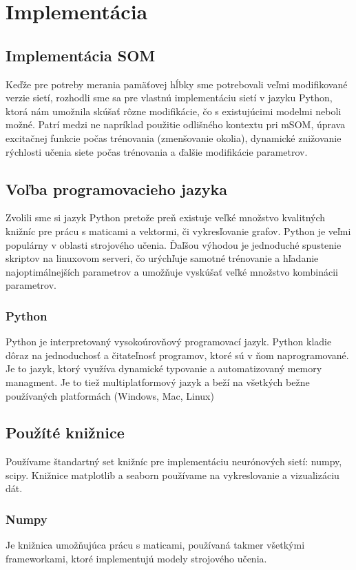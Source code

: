 \chapter{Implementácia}

\section{Implementácia SOM}
Keďže pre potreby merania pamäťovej hĺbky sme potrebovali 
veľmi modifikované verzie sietí, rozhodli sme sa pre vlastnú implementáciu sietí
v jazyku Python, ktorá nám umožnila skúšať rôzne modifikácie, čo 
s existujúcimi modelmi neboli možné. Patrí medzi ne napríklad použitie odlišného kontextu pri mSOM, 
úprava excitačnej funkcie počas trénovania (zmenšovanie okolia), dynamické znižovanie rýchlosti
učenia siete počas trénovania a ďalšie modifikácie parametrov.

\section{Voľba programovacieho jazyka}
Zvolili sme si jazyk Python pretože preň existuje veľké množstvo kvalitných knižníc pre prácu
s maticami a vektormi, či vykresľovanie grafov.
Python je veľmi populárny v oblasti strojového učenia. Ďaľšou výhodou je jednoduché spustenie skriptov
na linuxovom serveri, čo urýchľuje samotné trénovanie a hľadanie najoptimálnejších parametrov a umožňuje vyskúšať 
veľké množstvo kombinácii parametrov.
\subsection{Python}
Python je interpretovaný vysokoúrovňový programovací jazyk. 
Python kladie dôraz na jednoduchosť a čitateľnosť programov, ktoré sú v ňom naprogramované.
Je to jazyk, ktorý využíva dynamické typovanie a automatizovaný memory managment. Je to tiež multiplatformový 
jazyk a beží na všetkých bežne používaných platformách (Windows, Mac, Linux)

\section{Použíté knižnice}
Používame štandartný set knižníc pre implementáciu neurónových sietí: numpy, scipy.
Knižnice matplotlib a seaborn používame na vykreslovanie a vizualizáciu dát.
\subsection{Numpy}
Je knižnica umožňujúca prácu s maticami, používaná takmer všetkými
frameworkami, ktoré implementujú modely strojového učenia.
